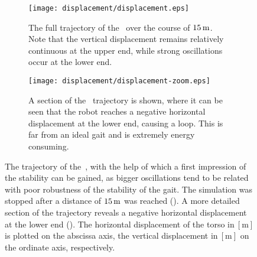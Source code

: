 \begin{figure}[H]%
    \centering%
    \begin{subfigure}[t]{0.74\linewidth}%
        \centering%
        \texttt{[image: displacement/displacement.eps]}
        \caption{The full trajectory of the~ over the course of $15\,\textrm{\si{\metre}}$. Note that the vertical displacement remains relatively continuous at the upper end, while strong oscillations occur at the lower end.}%
        \label{fig:displacement-full}%
        \vspace*{2mm}%
    \end{subfigure}%
    \vfil%
    \begin{subfigure}[b]{0.74\linewidth}%
        \centering%
        \texttt{[image: displacement/displacement-zoom.eps]}
        \caption{A section of the~ trajectory is shown, where it can be seen that the robot reaches a negative horizontal displacement at the lower end, causing a loop. This is far from an ideal gait and is extremely energy consuming.}%
        \label{fig:displacement-zoom}%
    \end{subfigure}%
    \caption{The trajectory of the~, with the help of which a first impression of the stability can be gained, as bigger oscillations tend to be related with poor robustness of the stability of the gait. The simulation was stopped after a distance of $15\,\textrm{\si{\metre}}$ was reached (). A more detailed section of the trajectory reveals a negative horizontal displacement at the lower end (). The horizontal displacement of the torso in$~\left[\si{\metre}\right]$ is plotted on the abscissa axis, the vertical displacement in$~\left[\si{\metre}\right]$ on the ordinate axis, respectively.}%
    \label{fig:displacement}%
\end{figure}%


